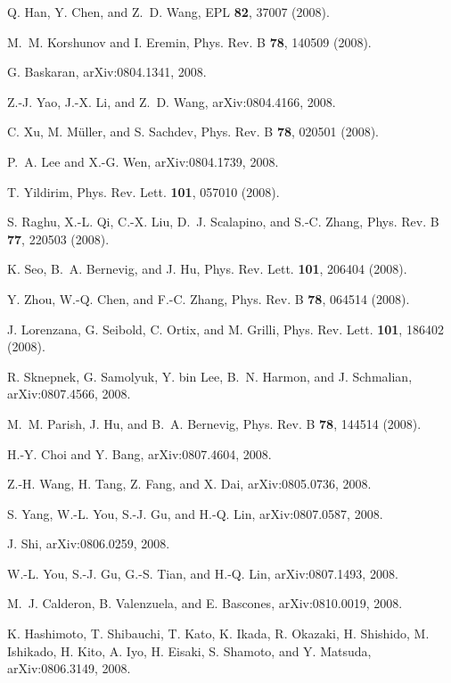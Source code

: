 \documentclass[aps,prb,superscriptaddress,preprintnumbers,
showpacs,legalpaper,twoside,twocolumn,amsmath,amssymb]{revtex4}
\begin{document}
\begin{thebibliography}{10}
Q. Han, Y. Chen, and Z.~D. Wang, EPL {\bf 82},  37007  (2008).

M.~M. Korshunov and I. Eremin, Phys. Rev. B {\bf 78},  140509  (2008).

G. Baskaran, arXiv:0804.1341, 2008.

Z.-J. Yao, J.-X. Li, and Z.~D. Wang, arXiv:0804.4166, 2008.

C. Xu, M. M\"{u}ller, and S. Sachdev, Phys. Rev. B {\bf 78},  020501  (2008).

P.~A. Lee and X.-G. Wen, arXiv:0804.1739, 2008.

T. Yildirim, Phys. Rev. Lett. {\bf 101},  057010  (2008).

S. Raghu, X.-L. Qi, C.-X. Liu, D.~J. Scalapino, and S.-C. Zhang, Phys. Rev. B
  {\bf 77},  220503  (2008).

K. Seo, B.~A. Bernevig, and J. Hu, Phys. Rev. Lett. {\bf 101},  206404  (2008).

Y. Zhou, W.-Q. Chen, and F.-C. Zhang, Phys. Rev. B {\bf 78},  064514  (2008).

J. Lorenzana, G. Seibold, C. Ortix, and M. Grilli, Phys. Rev. Lett. {\bf 101},
  186402  (2008).

R. Sknepnek, G. Samolyuk, Y. bin Lee, B.~N. Harmon, and J. Schmalian,
  arXiv:0807.4566, 2008.

M.~M. Parish, J. Hu, and B.~A. Bernevig, Phys. Rev. B {\bf 78},  144514
  (2008).

H.-Y. Choi and Y. Bang, arXiv:0807.4604, 2008.

Z.-H. Wang, H. Tang, Z. Fang, and X. Dai, arXiv:0805.0736, 2008.

S. Yang, W.-L. You, S.-J. Gu, and H.-Q. Lin, arXiv:0807.0587, 2008.

J. Shi, arXiv:0806.0259, 2008.

W.-L. You, S.-J. Gu, G.-S. Tian, and H.-Q. Lin, arXiv:0807.1493, 2008.

M.~J. Calderon, B. Valenzuela, and E. Bascones, arXiv:0810.0019, 2008.

K. Hashimoto, T. Shibauchi, T. Kato, K. Ikada, R. Okazaki, H. Shishido, M.
  Ishikado, H. Kito, A. Iyo, H. Eisaki, S. Shamoto, and Y. Matsuda,
  arXiv:0806.3149, 2008.


\end{thebibliography}
\end{document}
